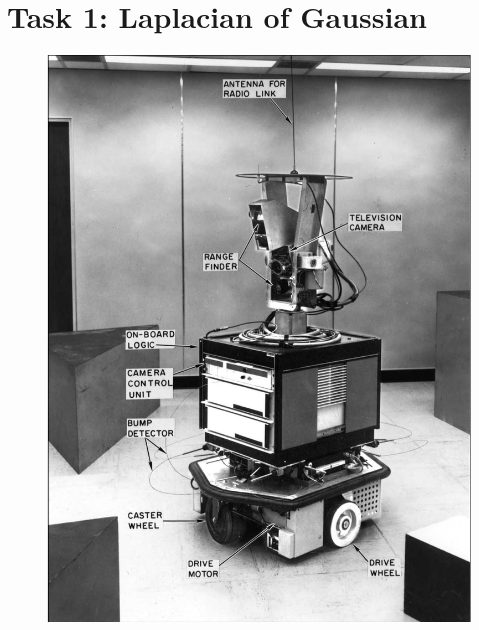 \documentclass[11pt]{article}
\begin{document}
\section*{Task 1: Laplacian of Gaussian}

\begin{figure}[h]
    \centering
    \begin{minipage}{0.3\textwidth}
        \centering
        \includegraphics[width=\linewidth]{../img/shakey_original.png}
    \end{minipage}\hfill
    \begin{minipage}{0.3\textwidth}
        \centering

\end{minipage}
\end{figure}
\end{document}
